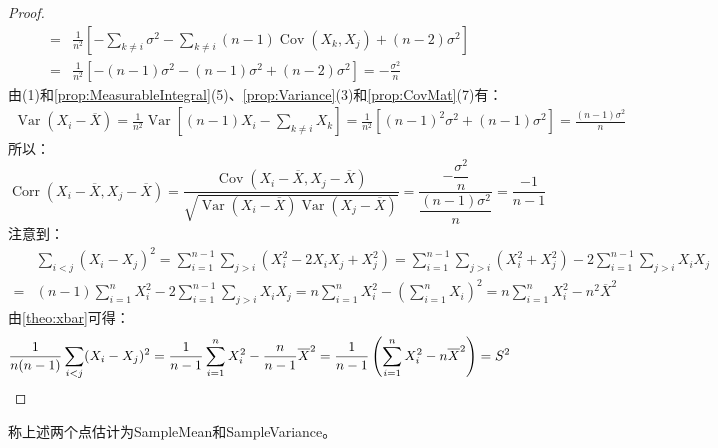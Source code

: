 \begin{proof}
\begin{align*}
		=&\frac{1}{n^2}\left[-\sum_{k\ne i}^{}\sigma^2-\sum_{k\ne i}^{}(n-1)\operatorname{Cov}(X_k,X_j)+(n-2)\sigma^2\right] \\
		=&\frac{1}{n^2}\left[-(n-1)\sigma^2-(n-1)\sigma^2+(n-2)\sigma^2\right]=-\frac{\sigma^2}{n}
	\end{align*}
	由(1)和\cref{prop:MeasurableIntegral}(5)、\cref{prop:Variance}(3)和\cref{prop:CovMat}(7)有：
	\begin{align*}
		\operatorname{Var}(X_i-\overline{X})=\frac{1}{n^2}\operatorname{Var}\left[(n-1)X_i-\sum_{k\ne i}^{}X_k\right]=\frac{1}{n^2}[(n-1)^2\sigma^2+(n-1)\sigma^2]=\frac{(n-1)\sigma^2}{n}
	\end{align*}
	所以：
	\begin{equation*}
		\operatorname{Corr}(X_i-\overline{X},X_j-\overline{X})=\frac{\operatorname{Cov}(X_i-\overline{X},X_j-\overline{X})}{\sqrt{\operatorname{Var}(X_i-\overline{X})\operatorname{Var}(X_j-\overline{X})}}=\dfrac{-\dfrac{\sigma^2}{n}}{\dfrac{(n-1)\sigma^2}{n}}=\frac{-1}{n-1}
	\end{equation*}
	注意到：
	\begin{align*}
		&\sum_{i<j}^{}(X_i-X_j)^2=\sum_{i=1}^{n-1}\sum_{j>i}^{}(X_i^2-2X_iX_j+X_j^2)=\sum_{i=1}^{n-1}\sum_{j>i}^{}(X_i^2+X_j^2)-2\sum_{i=1}^{n-1}\sum_{j>i}^{}X_iX_j \\
		=&(n-1)\sum_{i=1}^{n}X_i^2-2\sum_{i=1}^{n-1}\sum_{j>i}^{}X_iX_j=n\sum_{i=1}^{n}X_i^2-\left(\sum_{i=1}^{n}X_i\right)^2=n\sum_{i=1}^{n}X_i^2-n^2\overline{X}^2
	\end{align*}
	由\cref{theo:xbar}可得：
	\begin{equation*}
		\frac{1}{n(n-1)}\sum_{i<j}^{}(X_i-X_j)^2=\frac{1}{n-1}\sum_{i=1}^{n}X_i^2-\frac{n}{n-1}\overline{X}^2=\frac{1}{n-1}\left(\sum_{i=1}^{n}X_i^2-n\overline{X}^2\right)=S^2\qedhere
	\end{equation*}
\end{proof}
\begin{definition}
	称上述两个点估计为\gls{SampleMean}和\gls{SampleVariance}。
\end{definition}
